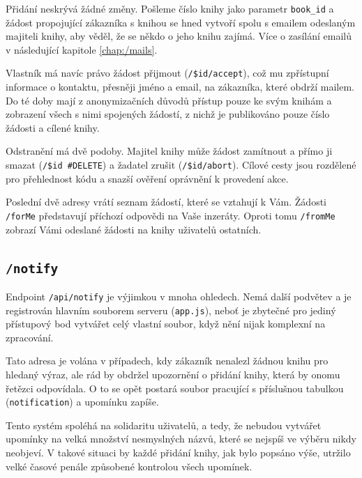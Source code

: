 \documentclass[a4paper,oneside,12pt]{report}
\begin{document}
Přidání neskrývá žádné změny. Pošleme číslo knihy jako parametr \texttt{book{\_}id} a
žádost propojující zákazníka s knihou se hned vytvoří spolu s emailem odeslaným majiteli
knihy, aby věděl, že se někdo o jeho knihu zajímá. Více o zasílání emailů v následující
kapitole \ref{chap:/mails}.

Vlastník má navíc právo žádost přijmout (\texttt{/\$id/accept}), což mu zpřístupní
informace o kontaktu, přesněji jméno a email, na zákazníka, které obdrží mailem. Do té
doby mají z anonymizačních důvodů přístup pouze ke svým knihám a zobrazení všech s nimi
spojených žádostí, z nichž je publikováno pouze číslo žádosti a cílené knihy.

Odstranění má dvě podoby. Majitel knihy může žádost zamítnout a přímo ji smazat
(\texttt{/\$id \#DELETE}) a žadatel zrušit (\texttt{/\$id/abort}). Cílové cesty jsou
rozdělené pro přehlednost kódu a snazší ověření oprávnění k provedení akce.

Poslední dvě adresy vrátí seznam žádostí, které se vztahují k Vám. Žádosti
\texttt{/forMe} představují příchozí odpovědi na Vaše inzeráty. Oproti tomu
\texttt{/fromMe} zobrazí Vámi odeslané žádosti na knihy uživatelů ostatních.

\subsection{\texttt{/notify}}

Endpoint \texttt{/api/notify} je výjimkou v mnoha ohledech. Nemá další podvětev a je
registrován hlavním souborem serveru (\texttt{app.js}), neboť je zbytečné pro
jediný přístupový bod vytvářet celý vlastní soubor, když nění nijak komplexní na
zpracování.

Tato adresa je volána v případech, kdy zákazník nenalezl žádnou knihu pro hledaný výraz,
ale rád by obdržel upozornění o přidání knihy, která by onomu řetězci odpovídala. O to se
opět postará soubor pracující s příslušnou tabulkou (\texttt{notification})
a\,\,upomínku zapíše.

Tento systém spoléhá na solidaritu uživatelů, a tedy, že nebudou vytvářet upomínky na
velká množství nesmyslných názvů, které se nejspíš ve výběru nikdy neobjeví. V\,\,takové
situaci by každé přidání knihy, jak bylo popsáno výše, utržilo velké časové penále
způsobené kontrolou všech upomínek.
\end{document}
